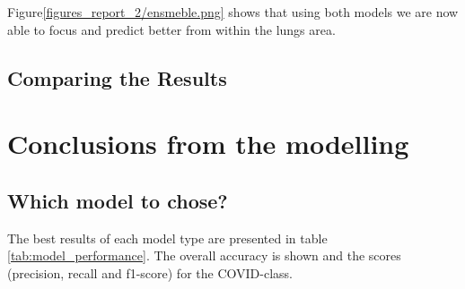 \documentclass{article}
\begin{document}
Figure\ref{figures_report_2/ensmeble.png} shows that using both models we are now able to focus and predict better from within the lungs area.

\subsection{Comparing the Results}

\section{Conclusions from the modelling}

\subsection{Which model to chose?}
The best results of each model type are presented in table \ref{tab:model_performance}. The overall accuracy is shown and the scores (precision, recall and f1-score) for the COVID-class. 
\end{document}
